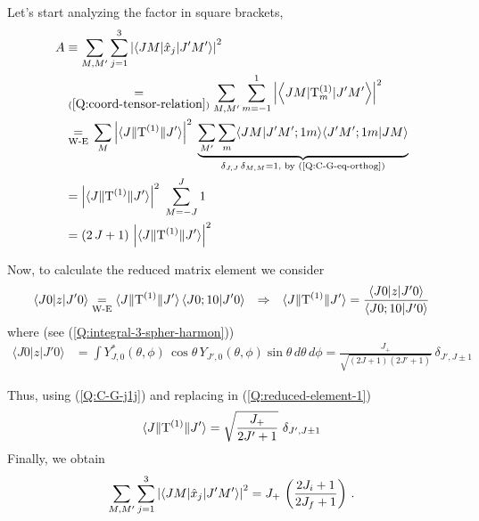 %

Let's start analyzing the factor in square brackets, 
\begin{subequations}
  \begin{align}
    A &\equiv \sum_{M, M'} \sum_{j=1}^{3} \left| \left\langle J M | \hat{x}_{j} | J' M' \right\rangle \right|^{2} \\
    &\mathrel{\mathop{\kern0pt=}\limits_{(\ref{Q:coord-tensor-relation})}} \sum_{M, M'} \sum_{m=-1}^{1} \left| \left\langle J M | \mathrm{T}^{(1)}_{m} | J' M' \right\rangle \right|^{2}  \\
    & \mathrel{\mathop{\kern0pt=}\limits_{\text{W-E}}} \, \sum_{M}  \left|\langle J \| \mathrm{T}^{(1)} \| J' \rangle\right|^{2} \; \underbrace{\sum_{M'} \sum_{m}  \langle J M | J' M'; 1 m \rangle \langle J' M'; 1 m | J M \rangle}_{\delta_{J,J}\,\delta_{M,M} = 1 \text{,~by (\ref{Q:C-G-eq-orthog})}} \\ 
    &= \left|\langle J \| \mathrm{T}^{(1)} \| J' \rangle\right|^{2} \; \sum_{M=-J}^{J} 1 \\
    &=(2\, J +1) \, \left|\langle J  \| \mathrm{T}^{(1)} \| J' \rangle\right|^{2}
  \end{align}
\end{subequations}

Now, to calculate the reduced matrix element we consider 
\begin{align} 
   \langle J 0 | z | J' 0 \rangle \mathrel{\mathop{\kern0pt=}\limits_{\text{W-E}}} \langle J \| \mathrm{T}^{(1)} \| J' \rangle \, \langle J 0 ; 1 0 | J' 0 \rangle && \Rightarrow   && \langle J \| \mathrm{T}^{(1)} \| J' \rangle = \frac{ \langle J 0 | z | J' 0 \rangle }{ \langle J 0 ; 1 0 | J' 0 \rangle} \label{Q:reduced-element-1}
\end{align}
%
where (see (\ref{Q:integral-3-spher-harmon}))
%
\begin{align}
 \langle J 0 |z | J' 0 \rangle &= \int Y^{*}_{J,0}(\theta,\phi)\, \cos{\theta}\,Y_{J',0}(\theta,\phi) \sin{\theta}\, d \theta \, d \phi
=\frac{J_{+}}{\sqrt{(2J+1)(2J'+1)}}\ \delta_{J',J\pm 1} 
\end{align}

Thus, using (\ref{Q:C-G-j1j}) and replacing in (\ref{Q:reduced-element-1})
\begin{equation}
  \label{Q:W-E-reduced-element-j1}
  \langle J \| \T \| J' \rangle = \sqrt{\frac{J_{+}}{2J'+1}}\ \delta_{J',J\pm 1} 
\end{equation}
Finally, we obtain
\begin{equation} \label{Q:absorption-J}
 \sum_{M, M'} \sum_{j=1}^{3} \left| \left\langle J M | \hat{x}_{j} | J' M' \right\rangle \right|^{2} =  J_{+}\, \left( \frac{2J_{i}+1}{2J_{f}+1} \right)  \,.
\end{equation}

